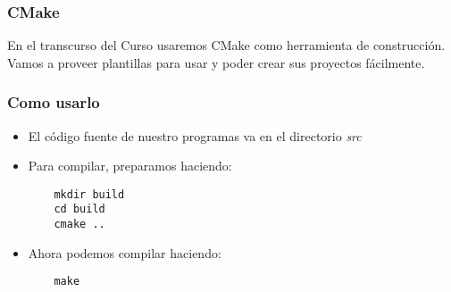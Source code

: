 \documentclass{beamer}
\begin{document}
\begin{frame}
\frametitle{CMake}
En el transcurso del Curso usaremos CMake como herramienta de construcción.
Vamos a proveer plantillas para usar y poder crear sus proyectos fácilmente.
\end{frame}

\begin{frame}[fragile]
\frametitle{Como usarlo}
\begin{itemize}
 \item El código fuente de nuestro programas va en el directorio \emph{src}
 \item Para compilar, preparamos haciendo:
 \begin{verbatim}
    mkdir build
    cd build
    cmake ..
 \end{verbatim}
  \item Ahora podemos compilar haciendo:
 \begin{verbatim}
    make
 \end{verbatim}
\end{itemize}

\end{frame}
\end{document}
